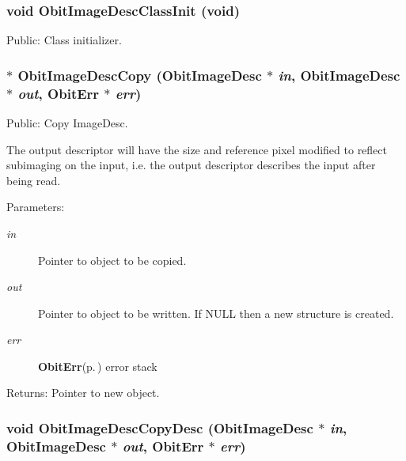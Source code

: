 \subsubsection{\setlength{\rightskip}{0pt plus 5cm}void Obit\-Image\-Desc\-Class\-Init (void)}\label{ObitImageDesc_8h_a9}


Public: Class initializer. 

\subsubsection{$\ast$ Obit\-Image\-Desc\-Copy ({\bf Obit\-Image\-Desc} $\ast$ {\em in}, {\bf Obit\-Image\-Desc} $\ast$ {\em out}, {\bf Obit\-Err} $\ast$ {\em err})}\label{ObitImageDesc_8h_a12}


Public: Copy Image\-Desc. 

The output descriptor will have the size and reference pixel modified to reflect subimaging on the input, i.e. the output descriptor describes the input after being read. \begin{Desc}
\item[Parameters:]
\begin{description}
\item[{\em in}]Pointer to object to be copied. \item[{\em out}]Pointer to object to be written. If NULL then a new structure is created. \item[{\em err}]{\bf Obit\-Err}{\rm (p.\,\pageref{structObitErr})} error stack \end{description}
\end{Desc}
\begin{Desc}
\item[Returns:]Pointer to new object. \end{Desc}
\subsubsection{\setlength{\rightskip}{0pt plus 5cm}void Obit\-Image\-Desc\-Copy\-Desc ({\bf Obit\-Image\-Desc} $\ast$ {\em in}, {\bf Obit\-Image\-Desc} $\ast$ {\em out}, {\bf Obit\-Err} $\ast$ {\em err})}\label{ObitImageDesc_8h_a13}


